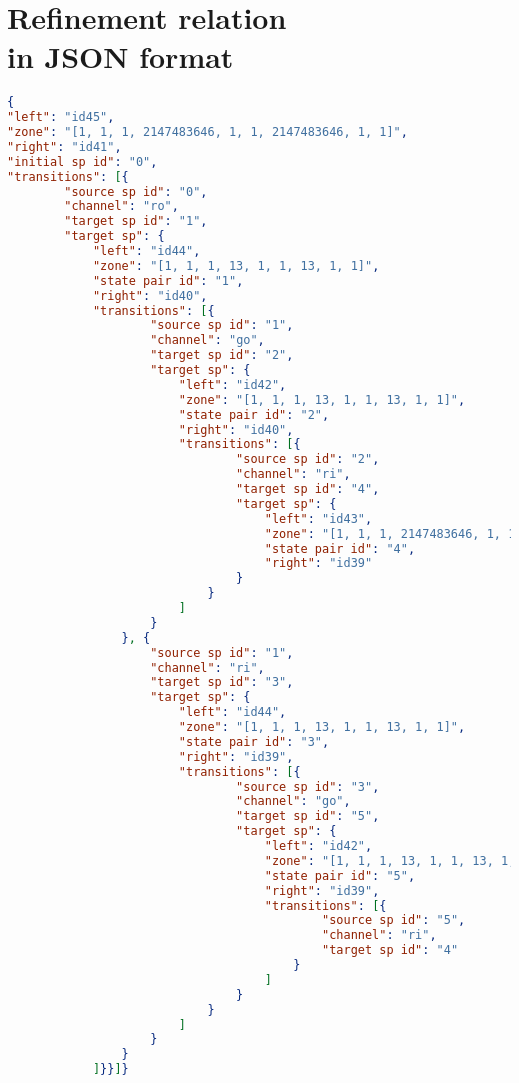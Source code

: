 \chapter[Refinement relation in JSON format]{Refinement relation\\ in JSON format}\label{ch:jsonRR}
\begin{lstlisting}[language=json,firstnumber=1,tabsize=2]
{
"left": "id45",
"zone": "[1, 1, 1, 2147483646, 1, 1, 2147483646, 1, 1]",
"right": "id41",
"initial sp id": "0",
"transitions": [{
		"source sp id": "0",
		"channel": "ro",
		"target sp id": "1",
		"target sp": {
			"left": "id44",
			"zone": "[1, 1, 1, 13, 1, 1, 13, 1, 1]",
			"state pair id": "1",
			"right": "id40",
			"transitions": [{
					"source sp id": "1",
					"channel": "go",
					"target sp id": "2",
					"target sp": {
						"left": "id42",
						"zone": "[1, 1, 1, 13, 1, 1, 13, 1, 1]",
						"state pair id": "2",
						"right": "id40",
						"transitions": [{
								"source sp id": "2",
								"channel": "ri",
								"target sp id": "4",
								"target sp": {
									"left": "id43",
									"zone": "[1, 1, 1, 2147483646, 1, 1, 2147483646, 1, 1]",
									"state pair id": "4",
									"right": "id39"
								}
							}
						]
					}
				}, {
					"source sp id": "1",
					"channel": "ri",
					"target sp id": "3",
					"target sp": {
						"left": "id44",
						"zone": "[1, 1, 1, 13, 1, 1, 13, 1, 1]",
						"state pair id": "3",
						"right": "id39",
						"transitions": [{
								"source sp id": "3",
								"channel": "go",
								"target sp id": "5",
								"target sp": {
									"left": "id42",
									"zone": "[1, 1, 1, 13, 1, 1, 13, 1, 1]",
									"state pair id": "5",
									"right": "id39",
									"transitions": [{
											"source sp id": "5",
											"channel": "ri",
											"target sp id": "4"
										}
									]
								}
							}
						]
					}
				}
			]}}]}



\end{lstlisting}